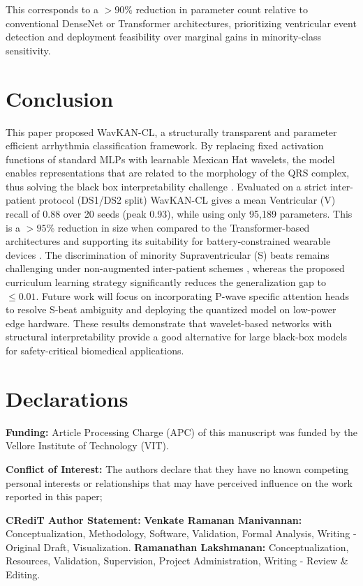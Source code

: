 \documentclass[pdflatex,sn-mathphys-num]{sn-jnl}
\theoremstyle{thmstyleone}
\theoremstyle{thmstyletwo}
\theoremstyle{thmstylethree}
\begin{document}
This corresponds to a $> 90\%$ reduction in parameter count relative to conventional DenseNet or Transformer architectures, prioritizing ventricular event detection and deployment feasibility over marginal gains in minority-class sensitivity.

\section{Conclusion}
\label{sec:conclusion}
This paper proposed WavKAN-CL, a structurally transparent and parameter efficient arrhythmia classification framework. By replacing fixed activation functions of standard MLPs with learnable Mexican Hat wavelets, the model enables representations that are related to the morphology of the QRS complex, thus solving the black box interpretability challenge \cite{taleban_explainable_2026}. Evaluated on a strict inter-patient protocol (DS1/DS2 split) WavKAN-CL gives a mean Ventricular (V) recall of 0.88 over 20 seeds (peak 0.93), while using only 95,189 parameters. This is a $>95\%$ reduction in size when compared to the Transformer-based architectures and supporting its suitability for battery-constrained wearable devices \cite{farag_tiny_2023}. The discrimination of minority Supraventricular (S) beats remains challenging under non-augmented inter-patient schemes \cite{bahrami_investigation_2025}, whereas the proposed curriculum learning strategy significantly reduces the generalization gap to $\le 0.01$. Future work will focus on incorporating P-wave specific attention heads to resolve S-beat ambiguity and deploying the quantized model on low-power edge hardware. These results demonstrate that wavelet-based networks with structural interpretability provide a good alternative for large black-box models for safety-critical biomedical applications.

\backmatter

\section*{Declarations}

\textbf{Funding:} Article Processing Charge (APC) of this manuscript was funded by the Vellore Institute of Technology (VIT).

\textbf{Conflict of Interest:} The authors declare that they have no known competing personal interests or relationships that may have perceived influence on the work reported in this paper;

\textbf{CRediT Author Statement:} 
\textbf{Venkate Ramanan Manivannan:} Conceptualization, Methodology, Software, Validation, Formal Analysis, Writing - Original Draft, Visualization. 
\textbf{Ramanathan Lakshmanan:} Conceptualization, Resources, Validation, Supervision, Project Administration, Writing - Review \& Editing.
\end{document}
